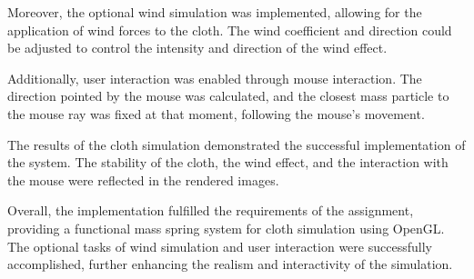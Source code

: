 \documentclass[acmtog]{acmart}
\begin{document}
Moreover, the optional wind simulation was implemented, allowing for the application of wind forces to the cloth. The wind coefficient and direction could be adjusted to control the intensity and direction of the wind effect.

Additionally, user interaction was enabled through mouse interaction. The direction pointed by the mouse was calculated, and the closest mass particle to the mouse ray was fixed at that moment, following the mouse's movement.

The results of the cloth simulation demonstrated the successful implementation of the system. The stability of the cloth, the wind effect, and the interaction with the mouse were reflected in the rendered images.

Overall, the implementation fulfilled the requirements of the assignment, providing a functional mass spring system for cloth simulation using OpenGL. The optional tasks of wind simulation and user interaction were successfully accomplished, further enhancing the realism and interactivity of the simulation.
\end{document}
